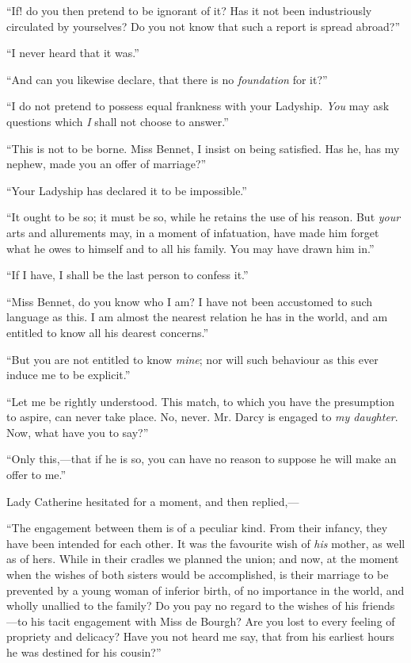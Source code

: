 \documentclass[12pt,openright]{book}
\begin{document}
“If! do you then pretend to be ignorant of it? Has it not been industriously circulated by yourselves? Do you not know that such a report is spread abroad?”

“I never heard that it was.”

“And can you likewise declare, that there is no \textit{foundation} for it?”

“I do not pretend to possess equal frankness with your Ladyship. \textit{You} may ask questions which \textit{I} shall not choose to answer.”

“This is not to be borne. Miss Bennet, I insist on being satisfied. Has he, has my nephew, made you an offer of marriage?”

“Your Ladyship has declared it to be impossible.”

“It ought to be so; it must be so, while he retains the use of his reason. But \textit{your} arts and allurements may, in a moment of infatuation, have made him forget what he owes to himself and to all his family. You may have drawn him in.”

“If I have, I shall be the last person to confess it.”

“Miss Bennet, do you know who I am? I have not been accustomed to such language as this. I am almost the nearest relation he has in the world, and am entitled to know all his dearest concerns.”

“But you are not entitled to know \textit{mine}; nor will such behaviour as this ever induce me to be explicit.”

“Let me be rightly understood. This match, to which you have the presumption to aspire, can never take place. No, never. Mr. Darcy is engaged to \textit{my daughter}. Now, what have you to say?”

“Only this,—that if he is so, you can have no reason to suppose he will make an offer to me.”

Lady Catherine hesitated for a moment, and then replied,—

“The engagement between them is of a peculiar kind. From their infancy, they have been intended for each other. It was the favourite wish of \textit{his} mother, as well as of hers. While in their cradles we planned the union; and now, at the moment when the wishes of both sisters would be accomplished, is their marriage to be prevented by a young woman of inferior birth, of no importance in the world, and wholly unallied to the family? Do you pay no regard to the wishes of his friends—to his tacit engagement with Miss de Bourgh? Are you lost to every feeling of propriety and delicacy? Have you not heard me say, that from his earliest hours he was destined for his cousin?”
\end{document}
